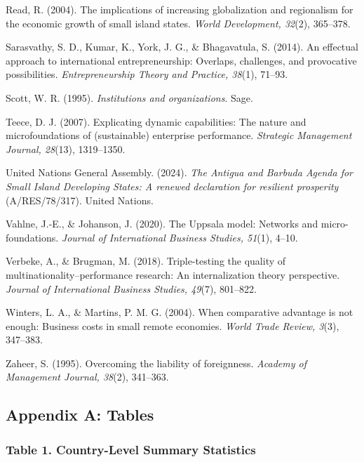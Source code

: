 \documentclass[
  12pt,a4paper]{article}
\begin{document}
Read, R. (2004). The implications of increasing globalization and
regionalism for the economic growth of small island states. \emph{World
Development, 32}(2), 365--378.

Sarasvathy, S. D., Kumar, K., York, J. G., \& Bhagavatula, S. (2014). An
effectual approach to international entrepreneurship: Overlaps,
challenges, and provocative possibilities. \emph{Entrepreneurship Theory
and Practice, 38}(1), 71--93.

Scott, W. R. (1995). \emph{Institutions and organizations}. Sage.

Teece, D. J. (2007). Explicating dynamic capabilities: The nature and
microfoundations of (sustainable) enterprise performance.
\emph{Strategic Management Journal, 28}(13), 1319--1350.

United Nations General Assembly. (2024). \emph{The Antigua and Barbuda
Agenda for Small Island Developing States: A renewed declaration for
resilient prosperity} (A/RES/78/317). United Nations.

Vahlne, J.-E., \& Johanson, J. (2020). The Uppsala model: Networks and
micro-foundations. \emph{Journal of International Business Studies,
51}(1), 4--10.

Verbeke, A., \& Brugman, M. (2018). Triple-testing the quality of
multinationality--performance research: An internalization theory
perspective. \emph{Journal of International Business Studies, 49}(7),
801--822.

Winters, L. A., \& Martins, P. M. G. (2004). When comparative advantage
is not enough: Business costs in small remote economies. \emph{World
Trade Review, 3}(3), 347--383.

Zaheer, S. (1995). Overcoming the liability of foreignness.
\emph{Academy of Management Journal, 38}(2), 341--363.

\hypertarget{appendix-a-tables}{%
\subsection{Appendix A: Tables}\label{appendix-a-tables}}

\hypertarget{table-1.-country-level-summary-statistics}{%
\subsubsection{Table 1. Country-Level Summary
Statistics}\label{table-1.-country-level-summary-statistics}}
\end{document}

